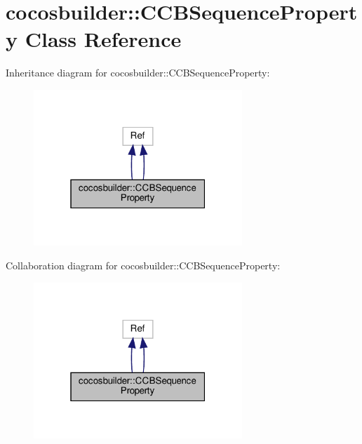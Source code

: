\hypertarget{classcocosbuilder_1_1CCBSequenceProperty}{}\section{cocosbuilder\+:\+:C\+C\+B\+Sequence\+Property Class Reference}
\label{classcocosbuilder_1_1CCBSequenceProperty}


Inheritance diagram for cocosbuilder\+:\+:C\+C\+B\+Sequence\+Property\+:
\nopagebreak
\begin{figure}[H]
\begin{center}
\leavevmode
\includegraphics[width=223pt]{classcocosbuilder_1_1CCBSequenceProperty__inherit__graph}
\end{center}
\end{figure}


Collaboration diagram for cocosbuilder\+:\+:C\+C\+B\+Sequence\+Property\+:
\nopagebreak
\begin{figure}[H]
\begin{center}
\leavevmode
\includegraphics[width=223pt]{classcocosbuilder_1_1CCBSequenceProperty__coll__graph}
\end{center}
\end{figure}
